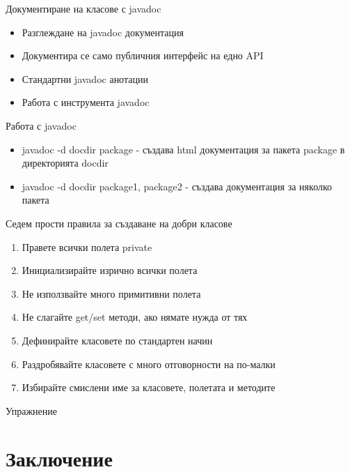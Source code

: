 \documentclass{beamer}
\begin{document}
\begin{frame}{Документиране на класове с javadoc}
  \transdissolve
  \begin{itemize}
  \item Разглеждане на javadoc документация
  \item Документира се само публичния интерфейс на едно API
  \item Стандартни javadoc анотации
  \item Работа с инструмента javadoc
  \end{itemize}
\end{frame}

\begin{frame}{Работа с javadoc}
  \transdissolve
  \begin{itemize}
  \item javadoc -d docdir package - създава html
    документация за пакета package в
    директорията docdir
  \item javadoc -d docdir package1, package2 - създава документация за няколко пакета
  \end{itemize}
\end{frame}

\begin{frame}{Седем прости правила за създаване на добри класове}
  \transdissolve
  \begin{enumerate}
  \item Правете всички полета private
  \item Инициализирайте изрично всички полета
  \item Не използвайте много примитивни полета
  \item Не слагайте get/set методи, ако нямате нужда от тях
  \item Дефинирайте класовете по стандартен начин
  \item Раздробявайте класовете с много отговорности на по-малки
  \item Избирайте смислени име за класовете, полетата и методите
  \end{enumerate}
\end{frame}

\begin{frame}{Упражнение}
  \transdissolve
  
\end{frame}

\section*{Заключение}
\end{document}
